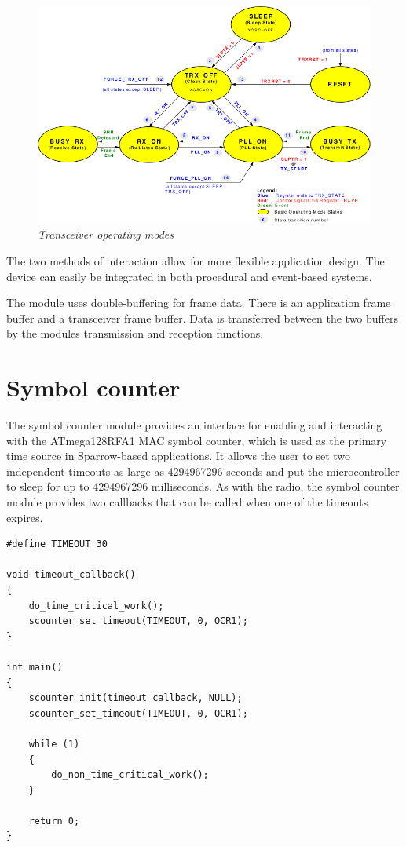 \begin{figure}[ht]
	\begin{center}
		\includegraphics[width=\textwidth]
		{img/transceiver_operating_modes.png}
	\end{center}
	\caption{\small \itshape{Transceiver operating
	modes\protect\footnotemark}}
\end{figure}

The two methods of interaction allow for more flexible application design.
The device can easily be integrated in both procedural and event-based systems.

The module uses double-buffering for frame data. There is an application frame
buffer and a transceiver frame buffer. Data is transferred between the two
buffers by the modules transmission and reception functions.

\section{Symbol counter}

The symbol counter module provides an interface for enabling and interacting
with the ATmega128RFA1 MAC symbol counter, which is used as the primary time
source in Sparrow-based applications. It allows the user to set two independent
timeouts as large as 4294967296 seconds and put the microcontroller to sleep
for up to 4294967296 milliseconds. As with the radio, the symbol counter module
provides two callbacks that can be called when one of the timeouts expires.

\lstset{
	language=C, numbers=none, caption=Time critical action snippet,
	label=lst:scounter_snippet
}
\begin{lstlisting}
#define TIMEOUT	30

void timeout_callback()
{
	do_time_critical_work();
	scounter_set_timeout(TIMEOUT, 0, OCR1);
}

int main()
{
	scounter_init(timeout_callback, NULL);
	scounter_set_timeout(TIMEOUT, 0, OCR1);

	while (1)
	{
		do_non_time_critical_work();
	}

	return 0;
}
\end{lstlisting}

